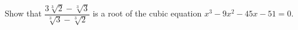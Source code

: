 Show that $\dfrac{3\sqrt[3]2-\sqrt[3]3}{\sqrt[3]3-\sqrt[3]2}$ is a root of the cubic equation $x^3-9x^2-45x-51=0$.
